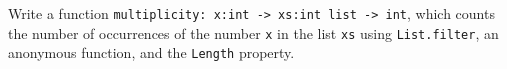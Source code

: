 Write a function \mbox{\lstinline{multiplicity: x:int -> xs:int list -> int}}, which counts the number of occurrences of the number \lstinline{x} in the list \lstinline{xs} using \lstinline{List.filter}, an anonymous function, and the \lstinline{Length} property.
